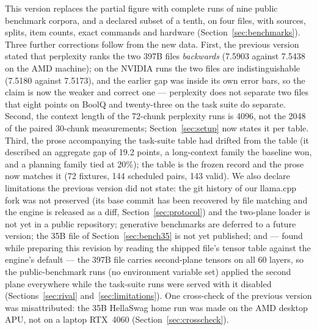 \documentclass[10pt]{article} %
\begin{document}
This version replaces the partial figure with complete runs of nine public
benchmark corpora, and a declared subset of a tenth, on four files, with sources, splits, item counts, exact
commands and hardware (Section~\ref{sec:benchmarks}). Three further corrections
follow from the new data. First, the previous version stated that perplexity
ranks the two 397B files \emph{backwards} (7.5903 against 7.5438 on the AMD
machine); on the NVIDIA runs the two files are indistinguishable (7.5180
against 7.5173), and the earlier gap was inside its own error bars, so the
claim is now the weaker and correct one --- perplexity does not separate two
files that eight points on BoolQ and twenty-three on the task suite do
separate. Second, the context length of the 72-chunk perplexity runs is 4096,
not the 2048 of the paired 30-chunk measurements; Section~\ref{sec:setup} now
states it per table. Third, the prose accompanying the task-suite table had
drifted from the table (it described an aggregate gap of 19.2 points, a
long-context family the baseline won, and a planning family tied at 20\%); the
table is the frozen record and the prose now matches it (72 fixtures, 144
scheduled pairs, 143 valid). We also declare limitations the previous version
did not state: the git history of our llama.cpp fork was not preserved (its
base commit has been recovered by file matching and the engine is released as
a diff, Section~\ref{sec:protocol}) and the two-plane loader is not yet in a
public repository;
generative benchmarks are deferred to a future version; the 35B file of
Section~\ref{sec:bench35} is not yet published; and --- found while preparing
this revision by reading the shipped file's tensor table against the engine's
default --- the 397B file carries second-plane tensors on all 60 layers, so
the public-benchmark runs (no environment variable set) applied the second
plane everywhere while the task-suite runs were served with it disabled
(Sections~\ref{sec:rival} and~\ref{sec:limitations}). One cross-check of the
previous version was misattributed: the 35B HellaSwag home run was made on the
AMD desktop APU, not on a laptop RTX~4060 (Section~\ref{sec:crosscheck}).

\nocite{yu2024superweight}



\end{document}
